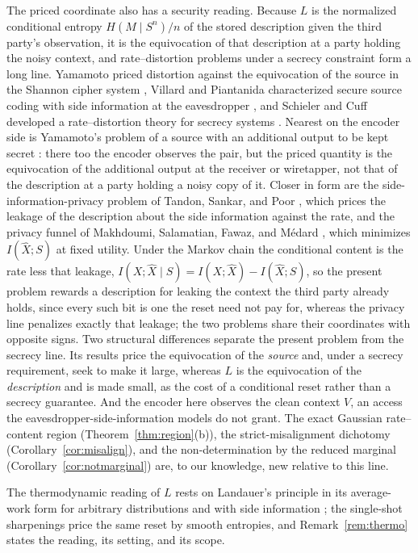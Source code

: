 \documentclass[11pt,onecolumn]{IEEEtran}
\newcommand{\hX}{\widehat{X}}
\begin{document}
The priced coordinate also has a security reading. Because $L$ is the
normalized conditional entropy $H(M\mid S^n)/n$ of the stored description given
the third party's observation, it is the equivocation of that description at a
party holding the noisy context, and rate--distortion problems under a secrecy
constraint form a long line. Yamamoto priced distortion against the equivocation
of the source in the Shannon cipher system \cite{yamamoto1997}, Villard and
Piantanida characterized secure source coding with side information at the
eavesdropper \cite{villard2013}, and Schieler and Cuff developed a
rate--distortion theory for secrecy systems \cite{schieler2014}. Nearest
on the encoder side is Yamamoto's problem of a source with an additional
output to be kept secret \cite{yamamoto1983}: there too the encoder
observes the pair, but the priced quantity is the equivocation of the
additional output at the receiver or wiretapper, not that of the
description at a party holding a noisy copy of it. Closer in
form are the side-information-privacy problem of Tandon, Sankar, and
Poor \cite{tandon2013}, which prices the leakage of the description
about the side information against the rate, and the privacy funnel of
Makhdoumi, Salamatian, Fawaz, and M\'edard \cite{makhdoumi2014}, which
minimizes $I(\hX;S)$ at fixed utility. Under the Markov chain the
conditional content is the rate less that leakage,
$I(X;\hX\mid S)=I(X;\hX)-I(\hX;S)$, so the present problem rewards a
description for leaking the context the third party already holds,
since every such bit is one the reset need not pay for, whereas the
privacy line penalizes exactly that leakage; the two problems share
their coordinates with opposite signs. Two structural
differences separate the present problem from the secrecy line. Its results price the
equivocation of the \emph{source} and, under a secrecy requirement, seek to make
it large, whereas $L$ is the equivocation of the \emph{description} and is made
small, as the cost of a conditional reset rather than a secrecy guarantee. And
the encoder here observes the clean context $V$, an access the
eavesdropper-side-information models do not grant. The exact Gaussian
rate--content region (Theorem~\ref{thm:region}(b)), the strict-misalignment
dichotomy (Corollary~\ref{cor:misalign}), and the non-determination by the
reduced marginal (Corollary~\ref{cor:notmarginal}) are, to our knowledge, new
relative to this line.

The thermodynamic reading of $L$ rests on Landauer's principle
\cite{landauer1961} in its average-work form for arbitrary distributions
\cite{esposito2011} and with side information \cite{sagawa2012,parrondo2015};
the single-shot sharpenings \cite{delrio2011,faist2015} price the same
reset by smooth entropies, and Remark~\ref{rem:thermo} states the
reading, its setting, and its scope.
\end{document}

